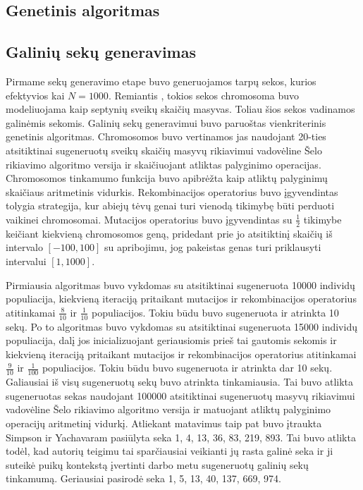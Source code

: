 \documentclass{VUMIFInfKursinis}
\begin{document}
\subsection{Genetinis algoritmas}

\subsection{Galinių sekų generavimas}
Pirmame sekų generavimo etape buvo generuojamos tarpų sekos, kurios efektyvios kai $N=1000$.
Remiantis \cite{simpson1999faster}, tokios sekos chromosoma buvo modeliuojama kaip
septynių sveikų skaičių masyvas.
Toliau šios sekos vadinamos galinėmis sekomis.
Galinių sekų generavimui buvo paruoštas vienkriterinis genetinis algoritmas.
Chromosomos buvo vertinamos jas naudojant 20-ties atsitiktinai
sugeneruotų sveikų skaičių masyvų rikiavimui vadovėline Šelo rikiavimo algoritmo versija ir skaičiuojant atliktas palyginimo operacijas.
Chromosomos tinkamumo funkcija buvo apibrėžta kaip atliktų palyginimų skaičiaus aritmetinis vidurkis.
Rekombinacijos operatorius buvo įgyvendintas tolygia strategija, kur abiejų tėvų genai turi vienodą tikimybę
būti perduoti vaikinei chromosomai.
Mutacijos operatorius buvo įgyvendintas su $\frac{1}{2}$ tikimybe keičiant kiekvieną chromosomos geną,
pridedant prie jo atsitiktinį skaičių iš intervalo $[-100, 100]$ su apribojimu, jog pakeistas genas turi priklausyti intervalui $[1, 1000]$.

Pirmiausia algoritmas buvo vykdomas su atsitiktinai sugeneruota 10000 individų populiacija, kiekvieną iteraciją pritaikant mutacijos ir rekombinacijos operatorius
atitinkamai $\frac{8}{10}$ ir $\frac{1}{10}$ populiacijos.
Tokiu būdu buvo sugeneruota ir atrinkta 10 sekų.
Po to algoritmas buvo vykdomas su atsitiktinai sugeneruota 15000 individų populiacija, dalį jos inicializuojant geriausiomis prieš tai gautomis sekomis
ir kiekvieną iteraciją pritaikant mutacijos ir rekombinacijos operatorius
atitinkamai $\frac{9}{10}$ ir $\frac{1}{100}$ populiacijos.
Tokiu būdu buvo sugeneruota ir atrinkta dar 10 sekų.
Galiausiai iš visų sugeneruotų sekų buvo atrinkta tinkamiausia.
Tai buvo atlikta sugeneruotas sekas naudojant 100000 atsitiktinai sugeneruotų masyvų rikiavimui
vadovėline Šelo rikiavimo algoritmo versija ir matuojant atliktų palyginimo operacijų aritmetinį vidurkį.
Atliekant matavimus taip pat buvo įtraukta Simpson ir Yachavaram pasiūlyta \cite{simpson1999faster} seka 1, 4, 13, 36, 83, 219, 893.
Tai buvo atlikta todėl, kad autorių teigimu tai sparčiausiai veikianti jų rasta galinė seka ir ji suteikė puikų kontekstą įvertinti
darbo metu sugeneruotų galinių sekų tinkamumą.
Geriausiai pasirodė seka 1, 5, 13, 40, 137, 669, 974.
\end{document}
